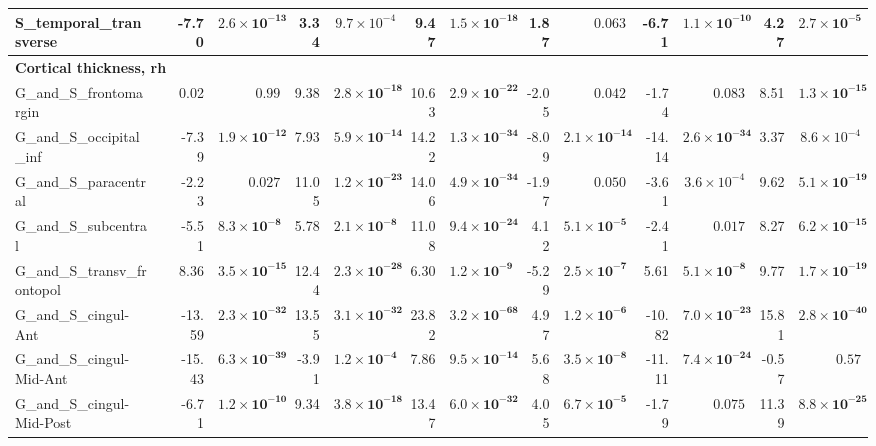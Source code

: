 {\begin{longtable}{llrrrrrrrrrrrr}
S\_temporal\_transverse &  & -7.70 & $\mathbf{2.6{\times}10^{-13}}$ & 3.34 & $9.7{\times}10^{-4}$ & 9.47 & $\mathbf{1.5{\times}10^{-18}}$ & 1.87 & $0.063$ & -6.71 & $\mathbf{1.1{\times}10^{-10}}$ & 4.27 & $\mathbf{2.7{\times}10^{-5}}$ \\
\midrule\multicolumn{14}{l}{\textbf{Cortical thickness, rh}} \\
G\_and\_S\_frontomargin &  & 0.02 & $0.99$ & 9.38 & $\mathbf{2.8{\times}10^{-18}}$ & 10.63 & $\mathbf{2.9{\times}10^{-22}}$ & -2.05 & $0.042$ & -1.74 & $0.083$ & 8.51 & $\mathbf{1.3{\times}10^{-15}}$ \\
G\_and\_S\_occipital\_inf &  & -7.39 & $\mathbf{1.9{\times}10^{-12}}$ & 7.93 & $\mathbf{5.9{\times}10^{-14}}$ & 14.22 & $\mathbf{1.3{\times}10^{-34}}$ & -8.09 & $\mathbf{2.1{\times}10^{-14}}$ & -14.14 & $\mathbf{2.6{\times}10^{-34}}$ & 3.37 & $8.6{\times}10^{-4}$ \\
G\_and\_S\_paracentral &  & -2.23 & $0.027$ & 11.05 & $\mathbf{1.2{\times}10^{-23}}$ & 14.06 & $\mathbf{4.9{\times}10^{-34}}$ & -1.97 & $0.050$ & -3.61 & $3.6{\times}10^{-4}$ & 9.62 & $\mathbf{5.1{\times}10^{-19}}$ \\
G\_and\_S\_subcentral &  & -5.51 & $\mathbf{8.3{\times}10^{-8}}$ & 5.78 & $\mathbf{2.1{\times}10^{-8}}$ & 11.08 & $\mathbf{9.4{\times}10^{-24}}$ & 4.12 & $\mathbf{5.1{\times}10^{-5}}$ & -2.41 & $0.017$ & 8.27 & $\mathbf{6.2{\times}10^{-15}}$ \\
G\_and\_S\_transv\_frontopol &  & 8.36 & $\mathbf{3.5{\times}10^{-15}}$ & 12.44 & $\mathbf{2.3{\times}10^{-28}}$ & 6.30 & $\mathbf{1.2{\times}10^{-9}}$ & -5.29 & $\mathbf{2.5{\times}10^{-7}}$ & 5.61 & $\mathbf{5.1{\times}10^{-8}}$ & 9.77 & $\mathbf{1.7{\times}10^{-19}}$ \\
G\_and\_S\_cingul-Ant &  & -13.59 & $\mathbf{2.3{\times}10^{-32}}$ & 13.55 & $\mathbf{3.1{\times}10^{-32}}$ & 23.82 & $\mathbf{3.2{\times}10^{-68}}$ & 4.97 & $\mathbf{1.2{\times}10^{-6}}$ & -10.82 & $\mathbf{7.0{\times}10^{-23}}$ & 15.81 & $\mathbf{2.8{\times}10^{-40}}$ \\
G\_and\_S\_cingul-Mid-Ant &  & -15.43 & $\mathbf{6.3{\times}10^{-39}}$ & -3.91 & $\mathbf{1.2{\times}10^{-4}}$ & 7.86 & $\mathbf{9.5{\times}10^{-14}}$ & 5.68 & $\mathbf{3.5{\times}10^{-8}}$ & -11.11 & $\mathbf{7.4{\times}10^{-24}}$ & -0.57 & $0.57$ \\
G\_and\_S\_cingul-Mid-Post &  & -6.71 & $\mathbf{1.2{\times}10^{-10}}$ & 9.34 & $\mathbf{3.8{\times}10^{-18}}$ & 13.47 & $\mathbf{6.0{\times}10^{-32}}$ & 4.05 & $\mathbf{6.7{\times}10^{-5}}$ & -1.79 & $0.075$ & 11.39 & $\mathbf{8.8{\times}10^{-25}}$ \\

\end{longtable}}
